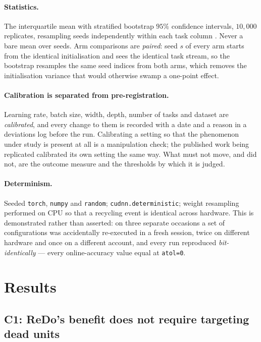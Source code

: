 \documentclass[10pt]{article}
\begin{document}
\paragraph{Statistics.} The interquartile mean with stratified bootstrap $95\%$
confidence intervals, $10{,}000$ replicates, resampling seeds independently
within each task column \citep{agarwal2021deep}. Never a bare mean over seeds.
Arm comparisons are \emph{paired}: seed $s$ of every arm starts from the
identical initialisation and sees the identical task stream, so the bootstrap
resamples the same seed indices from both arms, which removes the
initialisation variance that would otherwise swamp a one-point effect.

\paragraph{Calibration is separated from pre-registration.} Learning rate, batch
size, width, depth, number of tasks and dataset are \emph{calibrated}, and every
change to them is recorded with a date and a reason in a deviations log before
the run. Calibrating a setting so that the phenomenon under study is present at
all is a manipulation check; the published work being replicated calibrated its
own setting the same way. What must not move, and did not, are the outcome
measure and the thresholds by which it is judged.

\paragraph{Determinism.} Seeded \texttt{torch}, \texttt{numpy} and \texttt{random};
\texttt{cudnn.deterministic}; weight resampling performed on CPU so that a
recycling event is identical across hardware. This is demonstrated rather than
asserted: on three separate occasions a set of configurations was accidentally
re-executed in a fresh session, twice on different hardware and once on a
different account, and every run reproduced \emph{bit-identically} --- every
online-accuracy value equal at \texttt{atol=0}.

\section{Results}
\label{sec:results}

\subsection{C1: ReDo's benefit does not require targeting dead units}
\label{sec:c1}
\end{document}
